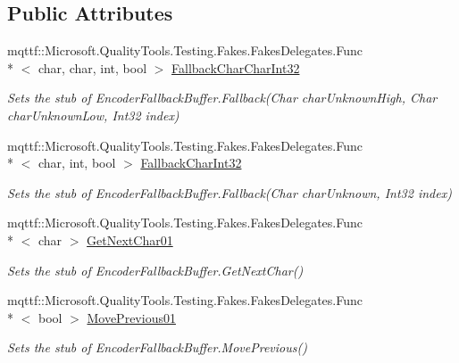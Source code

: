 \subsection*{Public Attributes}
\begin{DoxyCompactItemize}
\item 
mqttf\-::\-Microsoft.\-Quality\-Tools.\-Testing.\-Fakes.\-Fakes\-Delegates.\-Func\\*
$<$ char, char, int, bool $>$ \hyperlink{class_system_1_1_text_1_1_fakes_1_1_stub_encoder_fallback_buffer_ad25c6694376c67a7dec7e3322d1653ee}{Fallback\-Char\-Char\-Int32}
\begin{DoxyCompactList}\small\item\em Sets the stub of Encoder\-Fallback\-Buffer.\-Fallback(\-Char char\-Unknown\-High, Char char\-Unknown\-Low, Int32 index)\end{DoxyCompactList}\item 
mqttf\-::\-Microsoft.\-Quality\-Tools.\-Testing.\-Fakes.\-Fakes\-Delegates.\-Func\\*
$<$ char, int, bool $>$ \hyperlink{class_system_1_1_text_1_1_fakes_1_1_stub_encoder_fallback_buffer_a6809a08ed826a0412889bd03d68bd513}{Fallback\-Char\-Int32}
\begin{DoxyCompactList}\small\item\em Sets the stub of Encoder\-Fallback\-Buffer.\-Fallback(\-Char char\-Unknown, Int32 index)\end{DoxyCompactList}\item 
mqttf\-::\-Microsoft.\-Quality\-Tools.\-Testing.\-Fakes.\-Fakes\-Delegates.\-Func\\*
$<$ char $>$ \hyperlink{class_system_1_1_text_1_1_fakes_1_1_stub_encoder_fallback_buffer_a41d7f33caf66f83c5c8e289365eb50e8}{Get\-Next\-Char01}
\begin{DoxyCompactList}\small\item\em Sets the stub of Encoder\-Fallback\-Buffer.\-Get\-Next\-Char()\end{DoxyCompactList}\item 
mqttf\-::\-Microsoft.\-Quality\-Tools.\-Testing.\-Fakes.\-Fakes\-Delegates.\-Func\\*
$<$ bool $>$ \hyperlink{class_system_1_1_text_1_1_fakes_1_1_stub_encoder_fallback_buffer_a03a612b624e8772cbdb27ceaa5572364}{Move\-Previous01}
\begin{DoxyCompactList}\small\item\em Sets the stub of Encoder\-Fallback\-Buffer.\-Move\-Previous()\end{DoxyCompactList}\item 

\end{DoxyCompactItemize}

